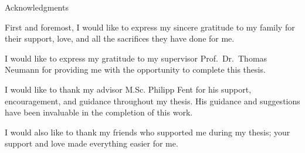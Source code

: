 \thispagestyle{empty}

\vspace*{20mm}

\begin{center}
{ Acknowledgments}
\end{center}

\vspace{10mm}

First and foremost, I would like to express my sincere gratitude to my family for their support, love, and all the sacrifices they have done for me.

I would like to express my gratitude to my supervisor Prof.\ Dr.\ Thomas Neumann for providing me with the opportunity to complete this thesis.

I would like to thank my advisor M.Sc. Philipp Fent for his support, encouragement, and guidance throughout my thesis. His guidance and suggestions have been invaluable in the completion of this work.

I would also like to thank my friends who supported me during my thesis; your support and love made everything easier for me.
\cleardoublepage{}
